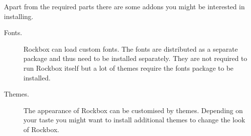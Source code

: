 Apart from the required parts there are some addons you might be interested
in installing.
\begin{description}
\item[Fonts.] Rockbox can load custom fonts. The fonts are
    distributed as a separate package and thus need to be installed
    separately. They are not required to run Rockbox itself but
    a lot of themes require the fonts package to be installed.

\item[Themes.] The appearance of Rockbox can be customised by themes. Depending
    on your taste you might want to install additional themes to change
    the look of Rockbox.
\end{description}


